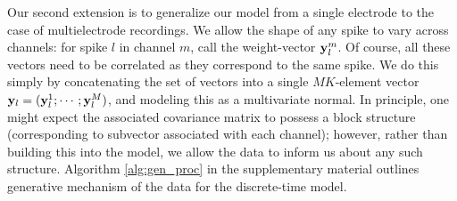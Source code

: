 Our second extension is to generalize our model from a single electrode to the case of multielectrode recordings. 
We allow the shape of any spike to vary across channels: for spike $l$ in channel $m$, call the weight-vector $\mathbf{y}^m_l$.
Of course, all these vectors need to be correlated as they correspond to the same spike. We do this simply by concatenating the set of vectors into
a single $MK$-element vector $\mathbf{y}_l = (\mathbf{y}^1_l;\cdots;\mathbf{y}^M_l)$, and modeling this as a multivariate normal. In principle, one might expect the associated 
covariance matrix to possess a block structure (corresponding to subvector associated with each channel); however, rather than building this into the model,
we allow the data to inform us about any such structure.
Algorithm \ref{alg:gen_proc} in the supplementary material outlines generative mechanism of the data for the discrete-time model.

